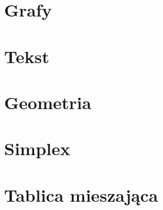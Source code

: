 \documentclass{article}
\begin{document}
\section{Grafy}

\newpage
\section{Tekst}

\newpage
\section{Geometria}

\newpage
\section{Simplex}

\newpage
\section{Tablica mieszająca}

\end{document}
